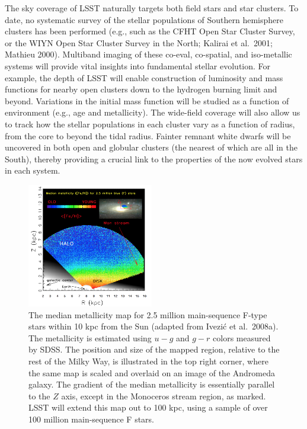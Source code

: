 \documentclass{emulateapj}
\begin{document}
The sky coverage of LSST naturally targets both field stars and star clusters.  To date, no systematic survey of the stellar 
populations of Southern hemisphere clusters has been performed (e.g., such as the CFHT Open Star Cluster Survey, or 
the WIYN Open Star Cluster Survey in the North; Kalirai et al.~2001; Mathieu 2000).  Multiband imaging of these co-eval, 
co-spatial, and iso-metallic systems will provide vital insights into fundamental stellar evolution.  For example, the depth 
of LSST will enable construction of  luminosity and mass functions for nearby open clusters down to the hydrogen burning
limit and beyond.  Variations in the initial mass function will be studied as a function of environment (e.g., age and metallicity).  
The wide-field coverage will also allow us to track how the stellar populations in each cluster vary as a function of radius, 
from the core to beyond the tidal radius. Fainter remnant white dwarfs will be uncovered in both open and globular clusters
(the nearest of which are all in the South), thereby providing a crucial link to the properties of the now evolved stars in each 
system.



\begin{figure}
\includegraphics[width=0.49\textwidth,clip]{panelsLSST.png}
\caption{
The median metallicity map for 2.5 million main-sequence F-type stars within 10 kpc 
from the Sun (adapted from Ivezi\'{c} et al.~2008a). The metallicity is estimated using 
$u-g$ and $g-r$ colors measured by SDSS. The position and size of the mapped 
region, relative to the rest of the Milky Way, is illustrated in the top right 
corner, where the same map is scaled and overlaid on an image of the Andromeda 
galaxy. The gradient of the median metallicity is essentially parallel
to the $Z$ axis, except in the Monoceros stream region, as marked. LSST 
will extend this map out to 100 kpc, using a sample of over 100 million 
main-sequence F stars.} 
\label{Fig:FeH3}
\end{figure}
\end{document}
